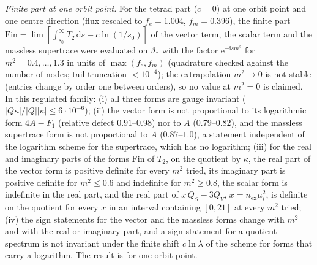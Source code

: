 \emph{Finite part at one orbit point.} For the tetrad part (\(c=0\)) at one orbit point and one centre direction (flux rescaled to \(f_e=1.004\), \(f_m=0.396\)), the finite part \(\mathrm{Fin}=\lim[\int_{s_0}^\infty T_2\,\mathrm ds-c\ln(1/s_0)]\) of the vector term, the scalar term and the massless supertrace were evaluated on \(\vartheta_*\) with the factor \(\mathrm e^{-\mathrm ism^2}\) for \(m^2=0.4,\dots,1.3\) in units of \(\max(f_e,f_m)\) (quadrature checked against the number of nodes; tail truncation \(<10^{-4}\)); the extrapolation \(m^2\to0\) is not stable (entries change by order one between orders), so no value at \(m^2=0\) is claimed. In this regulated family: (i) all three forms are gauge invariant (\(|Q\kappa|/|Q||\kappa|\le6\cdot10^{-6}\)); (ii) the vector form is not proportional to its logarithmic form \(4A-F_1\) (relative defect \(0.91\)--\(0.98\)) nor to \(A\) (\(0.79\)--\(0.82\)), and the massless supertrace form is not proportional to \(A\) (\(0.87\)--\(1.0\)), a statement independent of the logarithm scheme for the supertrace, which has no logarithm; (iii) for the real and imaginary parts of the forms \(\mathrm{Fin}\) of \(T_2\), on the quotient by \(\kappa\), the real part of the vector form is positive definite for every \(m^2\) tried, its imaginary part is positive definite for \(m^2\le0.6\) and indefinite for \(m^2\ge0.8\), the scalar form is indefinite in the real part, and the real part of \(x\,Q_S-3Q_V\), \(x=n_{\mathrm{ex}}\mu_i^2\), is definite on the quotient for every \(x\) in an interval containing \([0,21]\) at every \(m^2\) tried; (iv) the sign statements for the vector and the massless forms change with \(m^2\) and with the real or imaginary part, and a sign statement for a quotient spectrum is not invariant under the finite shift \(c\ln\lambda\) of the scheme for forms that carry a logarithm. The result is for one orbit point.

